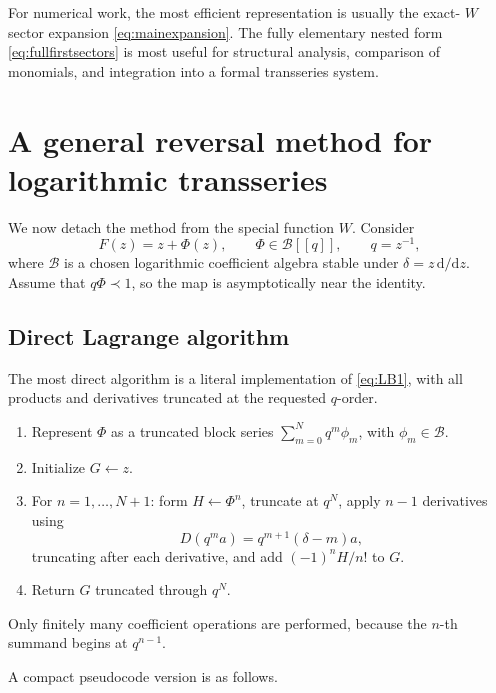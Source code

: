 \documentclass[11pt]{article}
\theoremstyle{clean}
\begin{document}
For numerical work, the most efficient representation is usually the exact-
\(W\) sector expansion \cref{eq:mainexpansion}.  The fully elementary nested
form \cref{eq:fullfirstsectors} is most useful for structural analysis,
comparison of monomials, and integration into a formal transseries system.

\section{A general reversal method for logarithmic transseries}

We now detach the method from the special function \(W\).  Consider
\begin{equation}\label{eq:generalF}
  F(z)=z+\Phi(z),
  \qquad
  \Phi\in\mathcal B[[q]],
  \qquad q=z^{-1},
\end{equation}
where \(\mathcal B\) is a chosen logarithmic coefficient algebra stable under
\(\delta=z\,\mathrm d/\mathrm dz\).  Assume that \(q\Phi\prec1\), so the map
is asymptotically near the identity.

\subsection{Direct Lagrange algorithm}

The most direct algorithm is a literal implementation of \cref{eq:LB1}, with
all products and derivatives truncated at the requested \(q\)-order.

\begin{methodbox}
\begin{enumerate}[leftmargin=2em]
\item Represent \(\Phi\) as a truncated block series
\(\sum_{m=0}^{N}q^m\phi_m\), with \(\phi_m\in\mathcal B\).
\item Initialize \(G\leftarrow z\).
\item For \(n=1,\ldots,N+1\):
  form \(H\leftarrow\Phi^n\), truncate at \(q^N\), apply \(n-1\)
  derivatives using
  \[
    D(q^m a)=q^{m+1}(\delta-m)a,
  \]
  truncating after each derivative, and add
  \((-1)^nH/n!\) to \(G\).
\item Return \(G\) truncated through \(q^N\).
\end{enumerate}
Only finitely many coefficient operations are performed, because the
\(n\)-th summand begins at \(q^{n-1}\).
\end{methodbox}

A compact pseudocode version is as follows.
\end{document}
